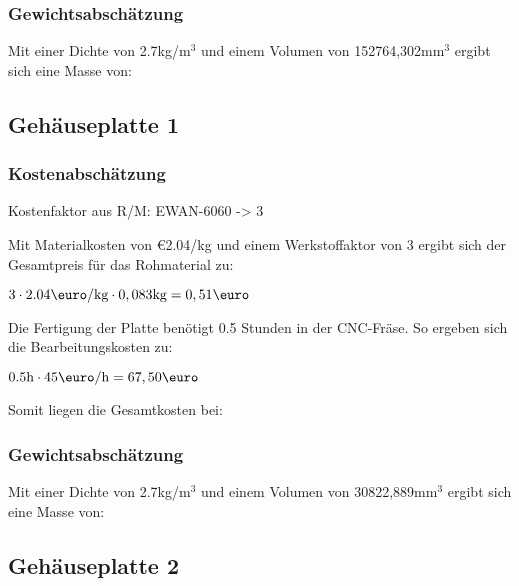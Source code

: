 \documentclass[10pt, a4paper]{article}
\begin{document}
\subsubsection{Gewichtsabschätzung}
Mit einer Dichte von 2.7kg/m$^3$ und einem Volumen von 152764,302mm$^3$ ergibt sich eine Masse von:
\begin{flushright}
\end{flushright}

\newpage
\subsection{Gehäuseplatte 1}
\begin{figure}[h]
  \centering
  \vspace{-10pt}
\end{figure}
\subsubsection{Kostenabschätzung}
\begin{center}
  Kostenfaktor aus R/M: EWAN-6060 -> 3
\end{center}
Mit Materialkosten von \euro2.04/kg und einem Werkstoffaktor von 3 ergibt sich der Gesamtpreis für das Rohmaterial zu: 
\begin{center}
    $3 \cdot 2.04\text{\euro/kg} \cdot 0,083\text{kg} = 0,51\text{\euro}$
\end{center}
Die Fertigung der Platte benötigt 0.5 Stunden in der CNC-Fräse. So ergeben sich die Bearbeitungskosten zu:
\begin{center}
  $0.5\text{h} \cdot 45\text{\euro/h}= 67,50\text{\euro}$
\end{center}
Somit liegen die Gesamtkosten bei:
\begin{flushright}
\end{flushright}
\subsubsection{Gewichtsabschätzung}
Mit einer Dichte von 2.7kg/m$^3$ und einem Volumen von 30822,889mm$^3$ ergibt sich eine Masse von:
\begin{flushright}
\end{flushright}

\newpage
\subsection{Gehäuseplatte 2}
\begin{figure}[h]
  \centering
  \vspace{-10pt}
\end{figure}
\end{document}
